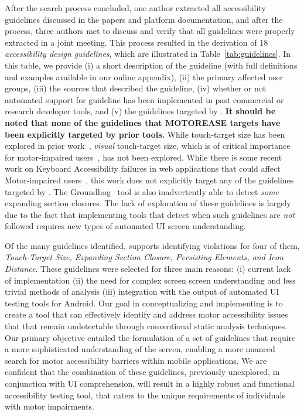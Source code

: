 After the search process concluded, one author extracted all accessibility guidelines discussed in the papers and platform documentation, and after the process, three authors met to discuss and verify that all guidelines were properly extracted in a joint meeting.  This process resulted in the derivation of 18 \textit{accessibility design guidelines}, which are illustrated in Table~\ref{tab:guidelines}. In this table, we provide (i) a short description of the guideline (with full definitions and examples available in our online appendix), (ii) the primary affected user groups, (iii) the sources that described the guideline, (iv) whether or not automated support for guideline has been implemented in past commercial or research developer tools, and (v) the guidelines targeted by \MotorEase. \textbf{It should be noted that none of the guidelines that M{\small OTOR}E{\small ASE} targets have been explicitly targeted by prior tools.} While touch-target size has been explored in prior work~\cite{Alshayban20, Abascal11, Kane11, GoogleAccess}, \textit{visual} touch-target size, which is of critical importance for motor-impaired users~\cite{Kong21}, has not been explored. While there is some recent work on Keyboard Accessibility failures in web applications that could affect Motor-impaired users~\cite{Chiou:CHI23}, this work does not explicitly target any of the guidelines targeted by \MotorEase. The Groundhog~\cite{Salehnamadi:ASE'22} tool is also inadvertently able to detect \textit{some} expanding section closures. The lack of exploration of these guidelines is largely due to the fact that implementing tools that detect when such guidelines are \textit{not} followed requires new types of automated UI screen understanding.


Of the many guidelines identified, \MotorEase supports identifying violations for four of them, \emph{Touch-Target Size, Expanding Section Closure, Persisting Elements, and Icon Distance}. These guidelines were selected for three main reasons: (i) current lack of implementation (ii) the need for complex screen screen understanding and less trivial methods of analysis (iii) integration with the output of automated UI testing tools for Android. Our goal in conceptualizing and implementing \MotorEase is to create a tool that can effectively identify and address motor accessibility issues that  that remain undetectable through conventional static analysis techniques. Our primary objective entailed the formulation of a set of guidelines that require a more sophisticated understanding of the screen, enabling a more nuanced search for motor accessibility barriers within mobile applications. We are confident that the combination of these guidelines, previously unexplored, in conjunction with UI comprehension, will result in a highly robust and functional accessibility testing tool, that caters to the unique requirements of individuals with motor impairments.


